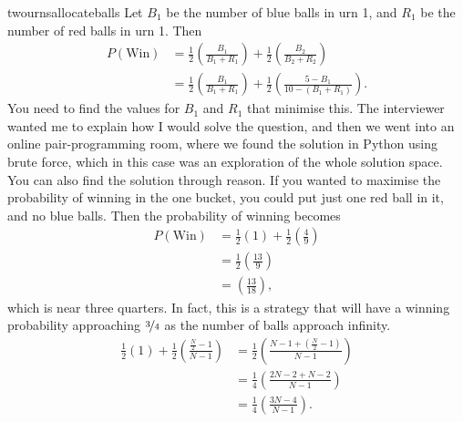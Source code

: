 \begin{answer}{twournsallocateballs}
Let $B_1$ be the number of blue balls in urn 1, and
$R_1$ be the number of red balls in urn 1.
Then
\begin{equation}
\label{eq:urns:crux}
\begin{aligned}
 P(\text{Win})
 &=
  \frac{1}{2}
  \left(
  \frac{B_1}{B_1 + R_1}
  \right)
  +
  \frac{1}{2}
  \left(
  \frac{B_2}{B_2 + R_2}
  \right)
  \\
 &=
  \frac{1}{2}
  \left(
  \frac{B_1}{B_1 + R_1}
  \right)
  +
  \frac{1}{2}
  \left(
  \frac{5 - B_1}{10 - (B_1 +R_1)}
  \right)
  \text{.}
\end{aligned}
\end{equation}
You need to find the values for $B_1$ and $R_1$ that minimise this.
The interviewer wanted me to explain how I would solve the question, and then we went into an online pair-programming room, where we found the solution in Python using brute force, which in this case was an exploration of the whole solution space.
You can also find the solution through reason.
If you wanted to maximise the probability of winning in the one bucket, you could put just one red ball in it, and no blue balls.
Then the probability of winning becomes
\begin{equation*}
\begin{aligned}
 P(\text{Win})
 &=
  \frac{1}{2}
  \left(
  1
  \right)
  +
  \frac{1}{2}
  \left(
  \frac{4}{9}
  \right)
  \\
 &=
  \frac{1}{2}
  \left(
  \frac{13}{9}
  \right)
  \\
 &=
  \left(
  \frac{13}{18}
  \right)
  \text{,}
\end{aligned}
\end{equation*}
which is near three quarters. In fact, this is a strategy that will have a winning probability approaching $\nicefrac{3}{4}$ as the number of balls approach infinity.
\begin{align*}
  \frac{1}{2}
  \left(
  1
  \right)
  +
  \frac{1}{2}
  \left(
  \frac{\frac{N}{2} - 1}{N - 1}
  \right)
  &=
  \frac{1}{2}
  \left(
  \frac{ N-1 + \left( \frac{N}{2} - 1 \right) }{N - 1}
  \right)
  \\
  &=
  \frac{1}{4}
  \left(
  \frac{ 2N-2 +  N - 2  }{N - 1}
  \right)
  \\
  &=
  \frac{1}{4}
  \left(
  \frac{ 3N - 4  }{N - 1}
  \right)
  \text{.}
\end{align*}


\end{answer}
